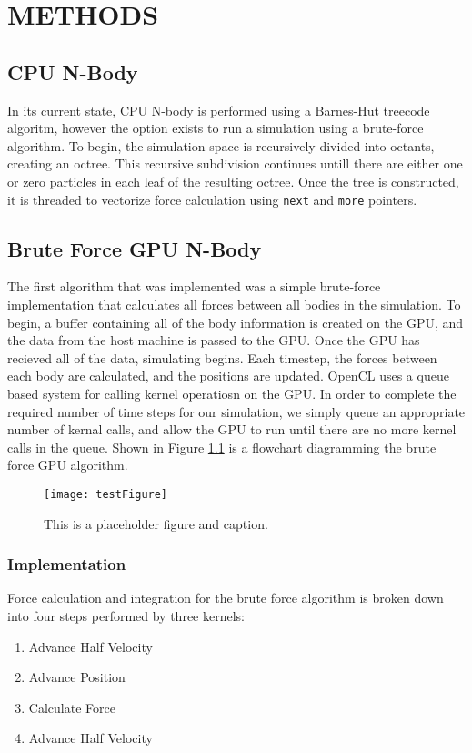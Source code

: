 \documentclass{thesis}
\begin{document}
\chapter{METHODS}
\section{CPU N-Body}
In its current state, CPU N-body is performed using a Barnes-Hut treecode algoritm, however the option exists to run a simulation using a brute-force algorithm. To begin, the simulation space is recursively divided into octants, creating an octree. This recursive subdivision continues untill there are either one or zero particles in each leaf of the resulting octree. Once the tree is constructed, it is threaded to vectorize force calculation using \texttt{next} and \texttt{more} pointers. 
\section{Brute Force GPU N-Body}
The first algorithm that was implemented was a simple brute-force implementation that calculates all forces between all bodies in the simulation. To begin, a buffer containing all of the body information is created on the GPU, and the data from the host machine is passed to the GPU. Once the GPU has recieved all of the data, simulating begins. Each timestep, the forces between each body are calculated, and the positions are updated. OpenCL uses a queue based system for calling kernel operatiosn on the GPU. In order to complete the required number of time steps for our simulation, we simply queue an appropriate number of kernal calls, and allow the GPU to run until there are no more kernel calls in the queue. Shown in Figure \ref{fig:GPUBruteForceAlg} is a flowchart diagramming the brute force GPU algorithm.

\begin{figure}[h]
    \caption{This is a placeholder figure and caption.}
    \label{fig:GPUBruteForceAlg}
    \centering
    \texttt{[image: testFigure]}
\end{figure}

\subsection{Implementation}
Force calculation and integration for the brute force algorithm is broken down into four steps performed by three kernels:
\begin{enumerate}
    \item Advance Half Velocity
    \item Advance Position
    \item Calculate Force
    \item Advance Half Velocity
\end{enumerate}
\end{document}
